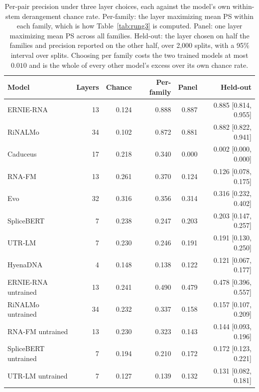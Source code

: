 \begin{table}[htbp]
\centering
\caption{Per-pair precision under three layer choices, each against the model's own within-stem derangement chance rate. Per-family: the layer maximizing mean PS within each family, which is how Table~\ref{tab:rung3} is computed. Panel: one layer maximizing mean PS across all families. Held-out: the layer chosen on half the families and precision reported on the other half, over 2,000 splits, with a 95\% interval over splits. Choosing per family costs the two trained models at most $0.010$ and is the whole of every other model's excess over its own chance rate.}
\label{tab:layer-selection}
\small
\begin{tabular}{@{}lrrrrr@{}}
\toprule
\textbf{Model} & \textbf{Layers} & \textbf{Chance} & \textbf{Per-family} & \textbf{Panel} & \textbf{Held-out} \\
\midrule
ERNIE-RNA & 13 & 0.124 & 0.888 & 0.887 & 0.885 [0.814, 0.955] \\
RiNALMo & 34 & 0.102 & 0.872 & 0.881 & 0.882 [0.822, 0.941] \\
Caduceus & 17 & 0.218 & 0.340 & 0.000 & 0.002 [0.000, 0.000] \\
RNA-FM & 13 & 0.261 & 0.370 & 0.124 & 0.126 [0.078, 0.175] \\
Evo & 32 & 0.316 & 0.356 & 0.314 & 0.316 [0.232, 0.402] \\
SpliceBERT & 7 & 0.238 & 0.247 & 0.203 & 0.203 [0.147, 0.257] \\
UTR-LM & 7 & 0.230 & 0.246 & 0.191 & 0.191 [0.130, 0.250] \\
HyenaDNA & 4 & 0.148 & 0.138 & 0.122 & 0.121 [0.067, 0.177] \\
ERNIE-RNA untrained & 13 & 0.241 & 0.490 & 0.479 & 0.478 [0.396, 0.557] \\
RiNALMo untrained & 34 & 0.232 & 0.337 & 0.158 & 0.157 [0.107, 0.209] \\
RNA-FM untrained & 13 & 0.230 & 0.323 & 0.143 & 0.144 [0.093, 0.196] \\
SpliceBERT untrained & 7 & 0.194 & 0.210 & 0.172 & 0.172 [0.123, 0.221] \\
UTR-LM untrained & 7 & 0.127 & 0.139 & 0.132 & 0.131 [0.082, 0.181] \\
\bottomrule
\end{tabular}
\end{table}
